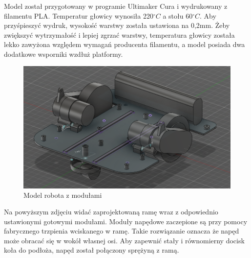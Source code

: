 Model został przygotowany w programie Ultimaker Cura i wydrukowany z filamentu PLA.
Temperatur głowicy wynosiła 220$ ^\circ C$ a stołu 60$ ^\circ C$. Aby przyśpieszyć wydruk, wysokość warstwy została ustawiona na 0,2mm. 
Żeby zwiększyć wytrzymałość i lepiej zgrzać warstwy, temperatura głowicy została lekko zawyżona względem wymagań producenta filamentu,
a model posiada dwa dodatkowe wsporniki wzdłuż platformy.

\begin{figure}[H]
	\centering
	\includegraphics[width=14cm]{pages/robot/zdjecia/robotModelCaly.png}
	\caption{Model robota z modułami}
	\label{fig:robotModelCaly}
\end{figure}

Na powyższym zdjęciu widać zaprojektowaną ramę wraz z odpowiednio ustawionymi gotowymi modułami. 
Moduły napędowe zaczepione są przy pomocy fabrycznego trzpienia wciskanego w ramę. 
Takie rozwiązanie oznacza że napęd może obracać się w wokół własnej osi. Aby zapewnić stały i równomierny docisk koła do podłoża,
napęd został połączony sprężyną z ramą. 

